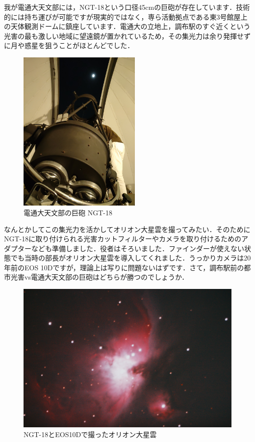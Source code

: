 \documentclass[supernova_2023]{subfiles}
\begin{document}
我が電通大天文部には，NGT-18という口径45cmの巨砲が存在しています．技術的には持ち運びが可能ですが現実的ではなく，専ら活動拠点である東3号館屋上の天体観測ドームに鎮座しています．電通大の立地上，調布駅のすぐ近くという光害の最も激しい地域に望遠鏡が置かれているため，その集光力は余り発揮せずに月や惑星を狙うことがほとんどでした．
\begin{figure}[H]
  \centering
  \includegraphics[height=8cm, angle=-90]{figures/Yosuke/NGT-18.jpg}
  \caption{電通大天文部の巨砲 NGT-18}
  \label{fig:NGT-18}
\end{figure}
なんとかしてこの集光力を活かしてオリオン大星雲を撮ってみたい．そのためにNGT-18に取り付けられる光害カットフィルターやカメラを取り付けるためのアダプターなども準備しました．役者はそろいました．ファインダーが使えない状態でも当時の部長がオリオン大星雲を導入してくれました．うっかりカメラは20年前のEOS 10Dですが，理論上は写りに問題ないはずです．さて，調布駅前の都市光害vs電通大天文部の巨砲はどちらが勝つのでしょうか．
\begin{figure}[H]
  \centering
  \includegraphics[width=.8\textwidth, angle=180]{figures/Yosuke/2023_01_10_Orion_Chofu_NGT-18_5-Composit.jpg}
  \caption{NGT-18とEOS10Dで撮ったオリオン大星雲}
  \label{fig:NGTOrion}
\end{figure}
\end{document}
